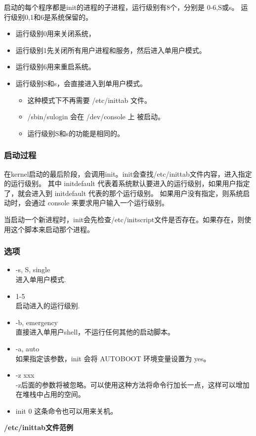 启动的每个程序都是init的进程的子进程，运行级别有8个，分别是 0-6,S或s。
运行级别0,1和6是系统保留的。

\begin{itemize}
\item
  运行级别0用来关闭系统，
\item
  运行级别1先关闭所有用户进程和服务，然后进入单用户模式。
\item
  运行级别6用来重启系统。
\item
  运行级别S和s，会直接进入到单用户模式。
  \begin{itemize}
  \item
    这种模式下不再需要 /etc/inittab 文件。
  \item
    /sbin/sulogin 会在 /dev/console 上 被启动。
  \item
    运行级别S和s的功能是相同的。
  \end{itemize}
\end{itemize}
\subsubsection{启动过程}

在kernel启动的最后阶段，会调用init。init会查找/etc/inittab文件内容，进入指定的运行级别。
其中 initdefault
代表着系统默认要进入的运行级别，如果用户指定了，就会进入到 initdefault
代表的那个运行级别。 如果用户没有指定，则系统启动时，会通过 console
来要求用户输入一个运行级别。

当启动一个新进程时，init会先检查/etc/initscript文件是否存在。如果存在，则使用这个脚本来启动那个进程。

\subsubsection{选项}

\begin{itemize}
\item
  -s, S, single\\ 进入单用户模式.
\item
  1-5\\ 启动进入的运行级别.
\item
  -b, emergency\\ 直接进入单用户shell，不运行任何其他的启动脚本。
\item
  -a, auto\\ 如果指定该参数，init 会将 AUTOBOOT 环境变量设置为 yes。
\item
  -z xxx\\
  -z后面的参数将被忽略。可以使用这种方法将命令行加长一点，这样可以增加在堆栈中占用的空间。
\item
  init 0 这条命令也可以用来关机。
\end{itemize}
\textbf{/etc/inittab文件范例}

